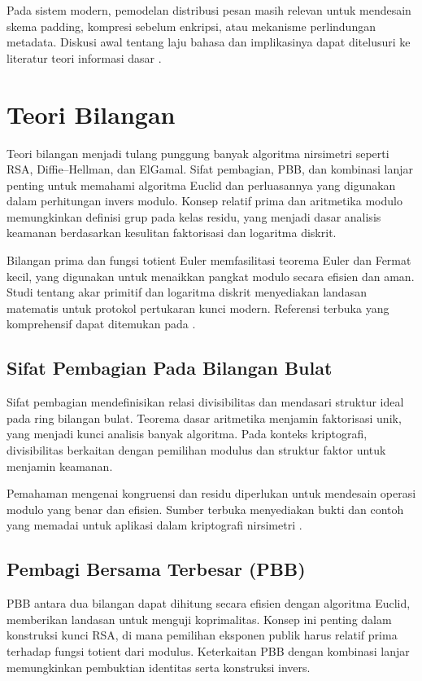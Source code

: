 \documentclass[../main.tex]{subfiles}
\begin{document}
Pada sistem modern, pemodelan distribusi pesan masih relevan untuk mendesain skema padding, kompresi sebelum enkripsi, atau mekanisme perlindungan metadata. Diskusi awal tentang laju bahasa dan implikasinya dapat ditelusuri ke literatur teori informasi dasar \parencite{menezes1996handbook}.

\section{Teori Bilangan}
Teori bilangan menjadi tulang punggung banyak algoritma nirsimetri seperti RSA, Diffie--Hellman, dan ElGamal. Sifat pembagian, PBB, dan kombinasi lanjar penting untuk memahami algoritma Euclid dan perluasannya yang digunakan dalam perhitungan invers modulo. Konsep relatif prima dan aritmetika modulo memungkinkan definisi grup pada kelas residu, yang menjadi dasar analisis keamanan berdasarkan kesulitan faktorisasi dan logaritma diskrit.

Bilangan prima dan fungsi totient Euler memfasilitasi teorema Euler dan Fermat kecil, yang digunakan untuk menaikkan pangkat modulo secara efisien dan aman. Studi tentang akar primitif dan logaritma diskrit menyediakan landasan matematis untuk protokol pertukaran kunci modern. Referensi terbuka yang komprehensif dapat ditemukan pada \textcite{menezes1996handbook,bonehshoup2020}.

\subsection{Sifat Pembagian Pada Bilangan Bulat}
Sifat pembagian mendefinisikan relasi divisibilitas dan mendasari struktur ideal pada ring bilangan bulat. Teorema dasar aritmetika menjamin faktorisasi unik, yang menjadi kunci analisis banyak algoritma. Pada konteks kriptografi, divisibilitas berkaitan dengan pemilihan modulus dan struktur faktor untuk menjamin keamanan.

Pemahaman mengenai kongruensi dan residu diperlukan untuk mendesain operasi modulo yang benar dan efisien. Sumber terbuka menyediakan bukti dan contoh yang memadai untuk aplikasi dalam kriptografi nirsimetri \parencite{menezes1996handbook}.

\subsection{Pembagi Bersama Terbesar (PBB)}
PBB antara dua bilangan dapat dihitung secara efisien dengan algoritma Euclid, memberikan landasan untuk menguji koprimalitas. Konsep ini penting dalam konstruksi kunci RSA, di mana pemilihan eksponen publik harus relatif prima terhadap fungsi totient dari modulus. Keterkaitan PBB dengan kombinasi lanjar memungkinkan pembuktian identitas serta konstruksi invers.
\end{document}
